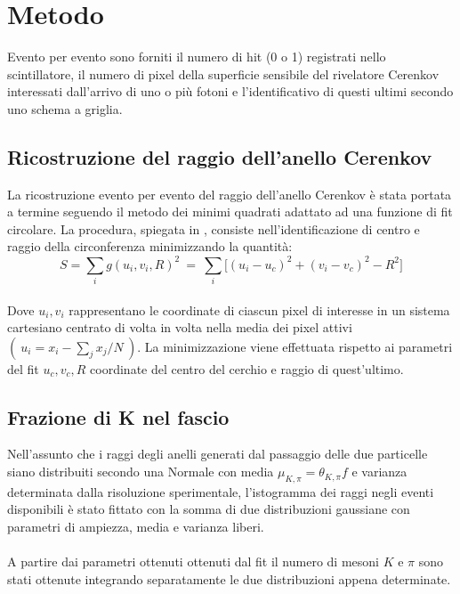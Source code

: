 \documentclass[8pt]{extarticle}
\begin{document}
\section{Metodo}
Evento per evento sono forniti il numero di hit (0 o 1) registrati nello scintillatore, il numero di pixel della superficie sensibile del rivelatore Cerenkov interessati dall'arrivo di uno o più fotoni e l'identificativo di questi ultimi secondo uno schema a griglia.\\
\subsection{Ricostruzione del raggio dell'anello Cerenkov}
La ricostruzione evento per evento del raggio dell'anello Cerenkov è stata portata a termine seguendo il metodo dei minimi quadrati adattato ad una funzione di fit circolare. La procedura, spiegata in \cite{fit_cerchio}, consiste nell'identificazione di centro e raggio della circonferenza minimizzando la quantità:
\begin{equation}
S=\sum_i g(u_i, v_i, R)^2 \ = \ \sum_i \Big[ (u_i-u_c)^2+(v_i-v_c)^2 - R^2 \Big]
\end{equation}
\\
Dove $u_i, v_i$ rappresentano le coordinate di ciascun pixel di interesse in un sistema cartesiano centrato di volta in volta nella media dei pixel attivi $( \ u_i=x_i-\sum_j x_j /N\ )$. La minimizzazione viene effettuata rispetto ai parametri del fit $u_c, v_c, R$ coordinate del centro del cerchio e raggio di quest'ultimo.\\
\subsection{Frazione di K nel fascio}
Nell'assunto che i raggi degli anelli generati dal passaggio delle due particelle siano distribuiti secondo una Normale con media $\mu_{K,\pi}=\theta_{K,\pi}f$ e varianza determinata dalla risoluzione sperimentale, l'istogramma dei raggi negli eventi disponibili è stato fittato con la somma di due distribuzioni gaussiane con parametri di ampiezza, media e varianza liberi.\\
\\
A partire dai parametri ottenuti ottenuti dal fit il numero di mesoni $K$ e $\pi$ sono stati ottenute integrando separatamente le due distribuzioni appena determinate.\\
\end{document}
